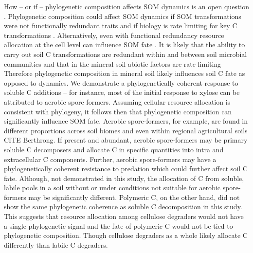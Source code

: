 How -- or if -- phylogenetic composition affects SOM dynamics is an open
question \citep{Schimel_2012}. Phylogenetic composition could affect SOM
dynamics if SOM transformations were not functionally redundant traits and
if biology is rate limiting for key C transformations
\citep{Schimel_2012}. Alternatively, even with functional redundancy
resource allocation at the cell level can influence SOM fate
\citep{Schimel_2012}. It is likely that the ability to carry out soil
C transformations are redundant
within and between soil microbial communities and that in the mineral soil
abiotic factors are rate limiting \citep{Schimel_2012} Therefore phylogenetic composition
in mineral soil likely influences soil C fate as opposed to dynamics. We
demonstrate a phylogenetically coherent response to soluble C additions --
for instance, most of the initial response to xylose can be attributed to
aerobic spore formers. Assuming cellular resource allocation is consistent
with phylogeny, it follows then that phylogenetic composition can
significantly influence SOM fate. Aerobic spore-formers, for example, are
found in different proportions across soil biomes \citep{Janssen2006} and
even within regional agricultural soils CITE Berthrong. If present and
abundant, aerobic spore-formers may be primary soluble C decomposers and
allocate C in specific quantities into intra and extracellular
C components. Further, aerobic spore-formers may have a phylogenetically
coherent resistance to predation which could further affect soil C fate.
Although, not demonstrated in this study, the allocation of C from
soluble, labile pools in a soil without or under conditions not suitable
for aerobic spore-formers may be significantly different. Polymeric C, on
the other hand, did not show the same phylogenetic coherence as soluble
C decomposition in this study. This suggests that resource allocation
among cellulose degraders would not have a single phylogenetic signal and
the fate of polymeric C would not be tied to phylogenetic composition.
Though cellulose degraders as a whole likely allocate C differently than
labile C degraders. 

